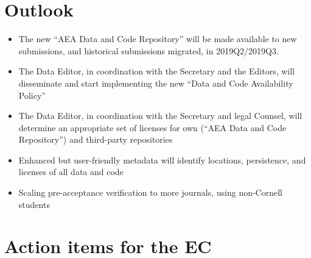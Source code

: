 \documentclass[AEJ]{AEA}
\begin{document}
\section{Outlook}
\begin{itemize}
	\item The new ``AEA Data and Code Repository'' will be made available to new submissions, and historical submissions migrated, in 2019Q2/2019Q3.
	\item The Data Editor, in coordination with the Secretary and the Editors, will disseminate and start implementing the new ``Data and Code Availability Policy''
	\item The Data Editor, in coordination with the Secretary and legal Counsel, will determine an appropriate set of licenses for own (``AEA Data and Code Repository'') and third-party repositories
	\item Enhanced but user-friendly metadata will identify locations, persistence, and licenses of all data and code 
	\item Scaling pre-acceptance verification to more journals, using non-Cornell students
\end{itemize}



\section{Action items for the EC}
\end{document}
